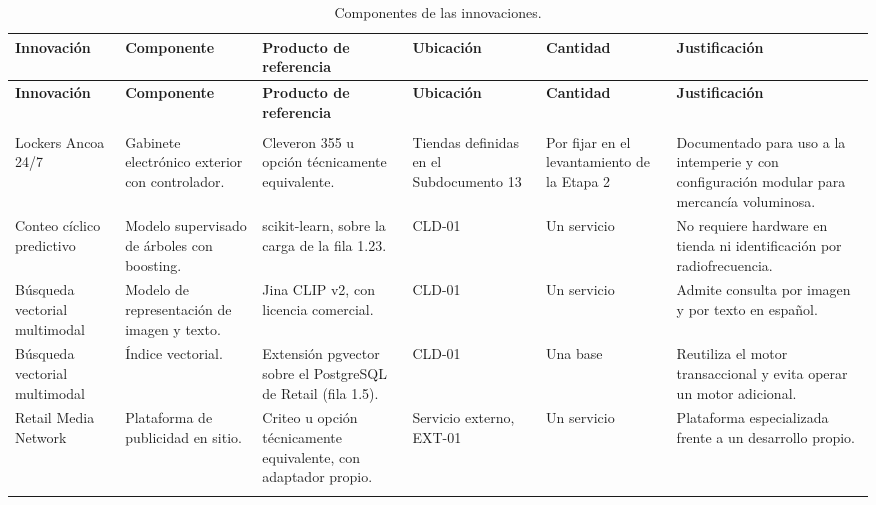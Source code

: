 \documentclass[11pt]{article}
\begin{document}
{\footnotesize
\begin{longtable}[]{@{}
  >{\raggedright\arraybackslash}p{}
  >{\raggedright\arraybackslash}p{}
  >{\raggedright\arraybackslash}p{}
  >{\raggedright\arraybackslash}p{}
  >{\raggedright\arraybackslash}p{}
  >{\raggedright\arraybackslash}p{}@{}}
\caption{Componentes de las innovaciones.}\label{tab:t11-10}\\
\toprule\noalign{}
\textbf{Innovación} & \textbf{Componente} & \textbf{Producto de referencia} & \textbf{Ubicación} & \textbf{Cantidad} & \textbf{Justificación} \\
\midrule\noalign{}
\endfirsthead
\toprule\noalign{}
\textbf{Innovación} & \textbf{Componente} & \textbf{Producto de referencia} & \textbf{Ubicación} & \textbf{Cantidad} & \textbf{Justificación} \\
\midrule\noalign{}
\endhead
\bottomrule\noalign{}
\multicolumn{6}{@{}p{\columnwidth}@{}}{\rule{0pt}{3.2ex}\textbf{Fuente:} Elaboración propia a partir del Subdocumento 13.} \\
\endlastfoot
Lockers Ancoa 24/7 & Gabinete electrónico exterior con controlador. & Cleveron 355 u opción técnicamente equivalente. & Tiendas definidas en el Subdocumento 13 & Por fijar en el levantamiento de la Etapa 2 & Documentado para uso a la intemperie y con configuración modular para mercancía voluminosa. \\ \addlinespace
Conteo cíclico predictivo & Modelo supervisado de árboles con boosting. & scikit-learn, sobre la carga de la fila 1.23. & CLD-01 & Un servicio & No requiere hardware en tienda ni identificación por radiofrecuencia. \\ \addlinespace
Búsqueda vectorial multimodal & Modelo de representación de imagen y texto. & Jina CLIP v2, con licencia comercial. & CLD-01 & Un servicio & Admite consulta por imagen y por texto en español. \\ \addlinespace
Búsqueda vectorial multimodal & Índice vectorial. & Extensión pgvector sobre el PostgreSQL de Retail (fila 1.5). & CLD-01 & Una base & Reutiliza el motor transaccional y evita operar un motor adicional. \\ \addlinespace
Retail Media Network & Plataforma de publicidad en sitio. & Criteo u opción técnicamente equivalente, con adaptador propio. & Servicio externo, EXT-01 & Un servicio & Plataforma especializada frente a un desarrollo propio. \\ \addlinespace

\end{longtable}}
\end{document}
